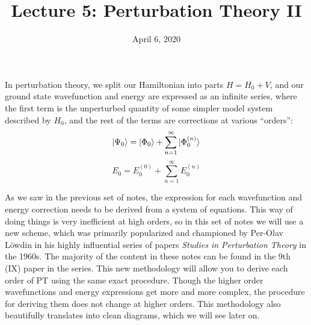 \documentclass{article}
\title{Lecture 5: Perturbation Theory II}
\date{April 6, 2020}
\newcommand{\Ezero}{E^{(0)}}
\newcommand{\En}{E^{(n)}}
\newcommand{\Phin}{\Phi^{(n)}}
\begin{document}
\maketitle
\noindent

In perturbation theory, we split our Hamiltonian into parts $H = H_0 + V$, and our ground 
state wavefunction and energy are expressed as an infinite series, where the first term is the unperturbed
quantity of some simpler model system described by $H_0$, and the rest of the terms
are corrections at various ``orders'':
\[\ket{\Psi_0} = \ket{\Phi_0} + \sum_{n=1}^{\infty} \ket{\Phin_0} \]
\[E_0 = \Ezero_0 + \sum_{n=1}^{\infty} \En_0\]

As we saw in the previous set of notes, the expression for each wavefunction and energy correction 
    needs to be derived from a system of equations.
This way of doing things is very inefficient at high orders, so in this set of notes 
    we will use a new scheme, which was primarily popularized and championed by Per-Olav L{\"o}wdin
    in his highly influential series of papers \textit{Studies in Perturbation Theory} in the 1960s.
The majority of the content in these notes can be found in the 9th (IX) paper in the series.
This new methodology will allow you to derive each order of PT using the same exact procedure. 
Though the higher order wavefunctions and energy expressions get more and more complex,
the procedure for deriving them does not change at higher orders.
This methodology also beautifully translates into clean diagrams, which we will see later on.

\end{document}
